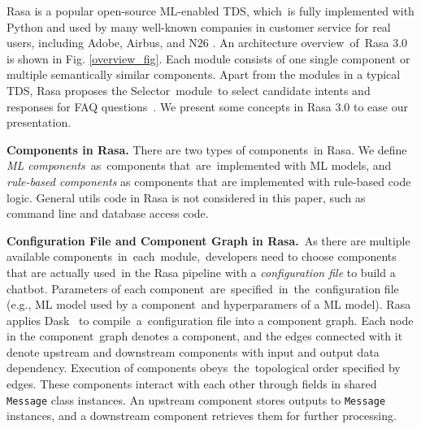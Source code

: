 Rasa is a popular open-source ML-enabled TDS, which~is fully implemented with Python and used by many well-known companies in customer service for real users, including Adobe, Airbus, and N26 \cite{rasa}. 
An architecture overview~of~Rasa 3.0 is shown in Fig. \ref{overview_fig}. %
Each module consists of one single component or multiple semantically similar components. 
Apart from the modules in a typical TDS, Rasa proposes the Selector~module~to select candidate intents and responses for FAQ questions~\cite{chaudhuri-etal-2018-improving}.
We present some concepts in Rasa 3.0 to ease our presentation.

\textbf{Components in Rasa.} There are two types of components~in Rasa. We define \textit{ML components}~as~components that~are~implemented with ML models, and \textit{rule-based components} as components that are implemented with rule-based code logic.
General utils code in Rasa is not considered in this paper, such as command line and database access code.

\textbf{Configuration File and Component Graph in Rasa.}~As there are multiple available components~in~each~module,~developers need to choose components that are actually used~in the Rasa pipeline with a \textit{configuration file} to build a chatbot. 
Parameters of each component~are~specified~in~the~configuration file (e.g., ML model used by a component~and hyperparamers of a ML model).
Rasa applies Dask~\cite{dask} to compile~a~configuration file into a component graph. 
Each node in the component~graph denotes a component, and the edges connected with it denote upstream and downstream components with input and output data dependency. 
Execution of components obeys~the~topological order specified by edges.
These components interact with each other through fields in shared \texttt{Message} class instances. %
An upstream component stores outputs to \texttt{Message} instances, and a downstream component retrieves them for further processing. 

